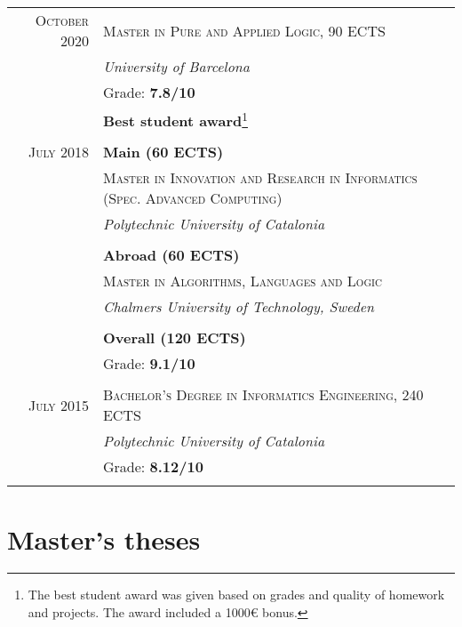 \documentclass[11pt]{article}
\begin{document}
\begin{tabular}{r|p{11cm}}
  \textsc{October 2020} & \textsc{Master in Pure and Applied Logic, 90 ECTS} \\
 & \emph{University of Barcelona}\\
   & Grade: \textbf{7.8/10} \\
                        & \textbf{Best student award}\footnote{The best student award was given based on grades and quality
                            of homework and projects. The award included a 1000€ bonus.} \\
\multicolumn{2}{c}{} \\

  \textsc{July 2018} & \textbf{Main (60 ECTS)} \\
                        & \textsc{Master in Innovation and Research in Informatics (Spec. Advanced Computing)} \\
                        & \emph{Polytechnic University of Catalonia} \\
                         \\
 & \textbf{Abroad (60 ECTS)}  \\
  & \textsc{Master in Algorithms, Languages and Logic} \\
                        & \emph{Chalmers University of Technology, Sweden} \\
                        \\
                        & \textbf{Overall (120 ECTS)}  \\
                        & Grade: \textbf{9.1/10} \\
  \multicolumn{2}{c}{} \\

  \textsc{July 2015} & \textsc{Bachelor's Degree in Informatics Engineering, 240 ECTS} \\
               & \emph{Polytechnic University of Catalonia}\\
               & Grade: \textbf{8.12/10} \\
  \multicolumn{2}{c}{} \\
\end{tabular}

\section{Master's theses}
\end{document}

